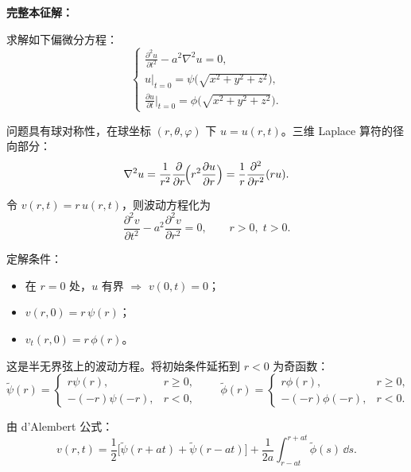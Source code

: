 \begin{question}[矩形域本征值问题]
\begin{solution}
\textbf{完整本征解：}

\end{solution}
\end{question}

\begin{question}[三维球对称波动方程]

求解如下偏微分方程：
\[
\begin{cases}
\displaystyle\frac{\partial^{2} u}{\partial t^{2}} - a^{2}\nabla^{2} u = 0,\\[8pt]
u|_{t=0} = \psi\!\bigl(\sqrt{x^{2}+y^{2}+z^{2}}\bigr),\\[4pt]
\displaystyle\frac{\partial u}{\partial t}\Big|_{t=0}
= \phi\!\bigl(\sqrt{x^{2}+y^{2}+z^{2}}\bigr).
\end{cases}
\]

\begin{solution}

问题具有球对称性，在球坐标 $(r,\theta,\varphi)$ 下 $u=u(r,t)$。三维 Laplace 算符的径向部分：
\[
\nabla^{2} u = \frac{1}{r^{2}}\frac{\partial}{\partial r}\!\Bigl(r^{2}\frac{\partial u}{\partial r}\Bigr)
= \frac{1}{r}\frac{\partial^{2}}{\partial r^{2}}(r u).
\]

令 $v(r,t) = r\,u(r,t)$，则波动方程化为
\[
\frac{\partial^{2} v}{\partial t^{2}} - a^{2}\frac{\partial^{2} v}{\partial r^{2}} = 0,
\qquad r>0,\; t>0.
\]

定解条件：
\begin{itemize}
  \item 在 $r=0$ 处，$u$ 有界 $\Longrightarrow$ $v(0,t)=0$；
  \item $v(r,0) = r\,\psi(r)$；
  \item $v_{t}(r,0) = r\,\phi(r)$。
\end{itemize}

这是半无界弦上的波动方程。将初始条件延拓到 $r<0$ 为奇函数：
\[
\tilde\psi(r) = \begin{cases} r\psi(r), & r\ge 0,\\ -(-r)\psi(-r), & r<0, \end{cases}\qquad
\tilde\phi(r) = \begin{cases} r\phi(r), & r\ge 0,\\ -(-r)\phi(-r), & r<0. \end{cases}
\]

由 d'Alembert 公式：
\[
v(r,t) = \frac{1}{2}\bigl[\tilde\psi(r+at) + \tilde\psi(r-at)\bigr]
+ \frac{1}{2a}\int_{r-at}^{r+at} \tilde\phi(s)\,\dd s.
\]


\end{solution}
\end{question}
